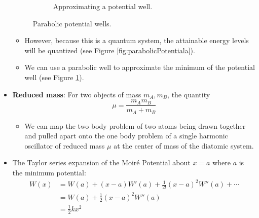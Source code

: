 \documentclass[../notes.tex]{subfiles}
\begin{document}
\begin{itemize}
\begin{figure}[h!]
\begin{subfigure}[b]{0.4\linewidth}
            \caption{Approximating a potential well.}
            \label{fig:parabolicPotentialb}
        \end{subfigure}
        \caption{Parabolic potential wells.}
        \label{fig:parabolicPotential}
    \end{figure}
    \begin{itemize}
        \item However, because this is a quantum system, the attainable energy levels will be quantized (see Figure \ref{fig:parabolicPotentiala}).
        \item We can use a parabolic well to approximate the minimum of the potential well (see Figure \ref{fig:parabolicPotentialb}).
    \end{itemize}
    \item \textbf{Reduced mass}: For two objects of mass $m_A,m_B$, the quantity
    \begin{equation*}
        \mu = \frac{m_Am_B}{m_A+m_B}
    \end{equation*}
    \begin{itemize}
        \item We can map the two body problem of two atoms being drawn together and pulled apart onto the one body problem of a single harmonic oscillator of reduced mass $\mu$ at the center of mass of the diatomic system.
    \end{itemize}
    \item The Taylor series expansion of the Moir\'{e} Potential about $x=a$ where $a$ is the minimum potential:
    \begin{align*}
        W(x) &= W(a)+(x-a)W'(a)+\frac{1}{2!}(x-a)^2W''(a)+\cdots\\
        &= W(a)+\frac{1}{2}(x-a)^2W''(a)\\
        &= \frac{1}{2}kx^2
    \end{align*}

\end{itemize}
\end{document}
